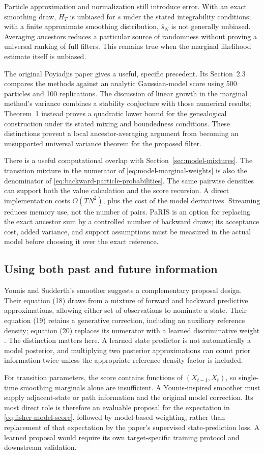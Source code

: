 Particle approximation and normalization still introduce error. With an
exact smoothing draw, $H_T$ is unbiased for $s$ under the stated integrability
conditions; with a finite approximate smoothing distribution,
$\widehat s_N$ is not generally unbiased. Averaging ancestors reduces a
particular source of randomness without proving a universal ranking of full
filters. This remains true when the marginal likelihood estimate itself is
unbiased.

The original Poyiadjis paper gives a useful, specific precedent. Its
Section~2.3 compares the methods against an analytic Gaussian-model score
using 500 particles and 100 replications. The discussion of linear growth in
the marginal method's variance combines a stability conjecture with those
numerical results; Theorem~1 instead proves a quadratic lower bound for the
genealogical construction under its stated mixing and boundedness conditions.
These distinctions prevent a local ancestor-averaging argument from becoming
an unsupported universal variance theorem for the proposed filter.

There is a useful computational overlap with
Section~\ref{sec:model-mixtures}. The transition mixture in the numerator
of \eqref{eq:model-marginal-weights} is also the denominator of
\eqref{eq:backward-particle-probabilities}. The same pairwise densities can
support both the value calculation and the score recursion. A direct
implementation costs $O(TN^2)$, plus the cost of the model derivatives.
Streaming reduces memory use, not the number of pairs. PaRIS is an option
for replacing the exact ancestor sum by a controlled number of backward
draws; its acceptance cost, added variance, and support assumptions must be
measured in the actual model before choosing it over the exact reference.

\subsection{Using both past and future information}

Younis and Sudderth's smoother suggests a complementary proposal design.
Their equation (18) draws from a mixture of forward and backward predictive
approximations, allowing either set of observations to nominate a state.
Their equation (19) retains a generative correction, including an auxiliary
reference density; equation (20) replaces its numerator with a learned
discriminative weight \citep[Section 4]{younis2024}. The distinction matters
here. A learned state predictor is not automatically a model posterior, and
multiplying two posterior approximations can count prior information twice
unless the appropriate reference-density factor is included.

For transition parameters, the score contains functions of
$(X_{t-1},X_t)$, so single-time smoothing marginals alone are insufficient.
A Younis-inspired smoother must supply adjacent-state or path information
and the original model correction. Its most direct role is therefore an
evaluable proposal for the expectation in \eqref{eq:fisher-model-score},
followed by model-based weighting, rather than replacement of that expectation
by the paper's supervised state-prediction loss. A learned proposal would
require its own target-specific training protocol and downstream validation.
